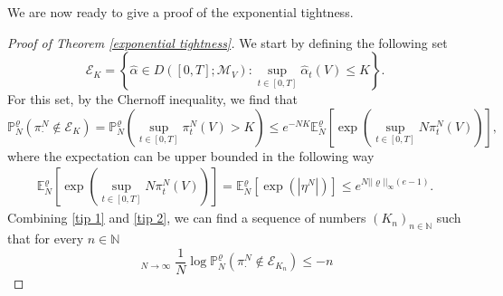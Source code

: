 \documentclass[11pt]{article}
\numberwithin{equation}{section}
\DeclareMathOperator*\uplim{\overline{lim}}
\theoremstyle{definition}
\theoremstyle{plain}
\newcommand{\E}{\mathbb{E}}
\newcommand{\p}{\mathbb{P}}
\begin{document}
We are now ready to give a proof of the exponential tightness.
\begin{proof}[Proof of Theorem \ref{exponential tightness}]
We start by defining the following set 
    \begin{equation}
        \mathcal{E}_K = \left \{\widehat{\alpha} \in D([0,T];\mathcal{M}_V): \sup_{t\in[0,T]} \widehat{\alpha}_t(V) \leq K\right \}.
    \end{equation}
For this set, by the Chernoff inequality, we find that  
    \begin{equation}\label{tip 1}
        \p^{\varrho}_N(\pi^N_{\cdot} \notin \mathcal{E}_K) = \p^{\varrho}_N\left(\sup_{t\in[0,T]} \pi^N_{t}(V) > K\right) \leq e^{-NK} \E^{\varrho}_N \left[\exp\left(\sup_{t\in[0,T]} N\pi^N_{t}(V)\right) \right],
    \end{equation}
where the expectation can be upper bounded in the following way
    \begin{align}\label{tip 2}
        \E^{\varrho}_N \left[\exp\left(\sup_{t\in[0,T]} N\pi^N_{t}(V)\right) \right] = \E^{\varrho}_N \left[\exp\left(|\eta^N|\right)\right] \leq e^{N||\varrho||_\infty(e-1)}.
    \end{align}
Combining \eqref{tip 1} and \eqref{tip 2}, we can find a sequence of numbers $(K_n)_{n\in\mathbb{N}}$ such that for every $n\in\mathbb{N}$
    \begin{equation}
        \uplim_{N\to\infty} \frac{1}{N}\log\p^{\varrho}_N(\pi^N_{\cdot} \notin \mathcal{E}_{K_n}) \leq -n
    \end{equation}


\end{proof}
\end{document}
